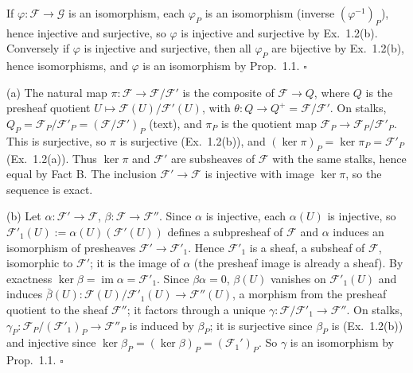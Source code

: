 \documentclass[11pt]{article}
\begin{document}
\pf
If $\varphi\colon\mathcal F\to\mathcal G$ is an isomorphism, each $\varphi_P$ is an isomorphism (inverse $(\varphi^{-1})_P$), hence injective and surjective, so $\varphi$ is injective and surjective by Ex.~1.2(b). Conversely if $\varphi$ is injective and surjective, then all $\varphi_P$ are bijective by Ex.~1.2(b), hence isomorphisms, and $\varphi$ is an isomorphism by Prop.~1.1. \hfill$\square$

\pf
(a) The natural map $\pi\colon\mathcal F\to\mathcal F/\mathcal F'$ is the composite of $\mathcal F\to Q$, where $Q$ is the presheaf quotient $U\mapsto\mathcal F(U)/\mathcal F'(U)$, with $\theta\colon Q\to Q^+=\mathcal F/\mathcal F'$. On stalks, $Q_P=\mathcal F_P/\mathcal F'_P=(\mathcal F/\mathcal F')_P$ (text), and $\pi_P$ is the quotient map $\mathcal F_P\to\mathcal F_P/\mathcal F'_P$. This is surjective, so $\pi$ is surjective (Ex.~1.2(b)), and $(\ker\pi)_P=\ker\pi_P=\mathcal F'_P$ (Ex.~1.2(a)). Thus $\ker\pi$ and $\mathcal F'$ are subsheaves of $\mathcal F$ with the same stalks, hence equal by Fact B. The inclusion $\mathcal F'\to\mathcal F$ is injective with image $\ker\pi$, so the sequence is exact.

(b) Let $\alpha\colon\mathcal F'\to\mathcal F$, $\beta\colon\mathcal F\to\mathcal F''$. Since $\alpha$ is injective, each $\alpha(U)$ is injective, so $\mathcal F'_1(U):=\alpha(U)(\mathcal F'(U))$ defines a subpresheaf of $\mathcal F$ and $\alpha$ induces an isomorphism of presheaves $\mathcal F'\to\mathcal F'_1$. Hence $\mathcal F'_1$ is a sheaf, a subsheaf of $\mathcal F$, isomorphic to $\mathcal F'$; it is the image of $\alpha$ (the presheaf image is already a sheaf). By exactness $\ker\beta=\operatorname{im}\alpha=\mathcal F'_1$. Since $\beta\alpha=0$, $\beta(U)$ vanishes on $\mathcal F'_1(U)$ and induces $\bar\beta(U)\colon\mathcal F(U)/\mathcal F'_1(U)\to\mathcal F''(U)$, a morphism from the presheaf quotient to the sheaf $\mathcal F''$; it factors through a unique $\gamma\colon\mathcal F/\mathcal F'_1\to\mathcal F''$. On stalks, $\gamma_P\colon\mathcal F_P/(\mathcal F'_1)_P\to\mathcal F''_P$ is induced by $\beta_P$; it is surjective since $\beta_P$ is (Ex.~1.2(b)) and injective since $\ker\beta_P=(\ker\beta)_P=(\mathcal F_1')_P$. So $\gamma$ is an isomorphism by Prop.~1.1. \hfill$\square$
\end{document}
